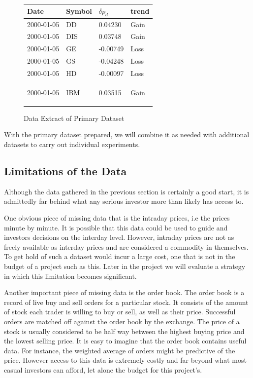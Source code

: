 \documentclass{report}
\begin{document}
\begin{figure}[H]
\caption{Data Extract of Primary Dataset}
\begin{center}
  
    \begin{tabular}{l | l | l | l }
      Date & Symbol & $\delta p_{d}$ & trend \\ \hline
      2000-01-05 & DD  &	0.04230 	& Gain \\ \hline
      2000-01-05 & DIS &	0.03748 	& Gain \\ \hline
      2000-01-05 & GE  &	-0.00749 	& Loss \\ \hline
      2000-01-05 & GS  &	-0.04248 	& Loss \\ \hline
      2000-01-05 & HD  &	-0.00097 	& Loss \\ \hline
      2000-01-05 & IBM &	0.03515 	& Gain

    \label{table:data-example-0}
    \end{tabular}
\end{center}
\end{figure}

With the primary dataset prepared, we will combine it as needed with additional datasets to carry out individual experiments. 

\subsection{Limitations of the Data}

Although the data gathered in the previous section is certainly a good start, it is admittedly far behind what any serious investor more than likely has access to. 

One obvious piece of missing data that is the intraday prices, i.e the prices minute by minute. It is possible that this data could be used to guide and investors decisions on the interday level. However, intraday prices are not as freely available as interday prices and are considered a commodity in themselves. To get hold of such a dataset would incur a large cost, one that is not in the budget of a project such as this. Later in the project we will evaluate a strategy in which this limitation becomes significant.

Another important piece of missing data is the order book. The order book is a record of live buy and sell orders for a particular stock. It consists of the amount of stock each trader is willing to buy or sell, as well as their price. Successful orders are matched off against the order book by the exchange. The price of a stock is usually considered to be half way between the highest buying price and the lowest selling price. It is easy to imagine that the order book contains useful data. For instance, the weighted average of orders might be predictive of the price. However access to this data is extremely costly and far beyond what most casual investors can afford, let alone the budget for this project's.
\end{document}
